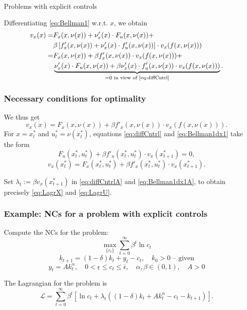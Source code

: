 \documentclass[10pt]{beamer}
\theoremstyle{definition}
\begin{document}
\begin{section}{Problems with explicit controls}
\begin{frame}[fragile]
Differentiating \eqref{eq:Bellman1} w.r.t. $ x $, we obtain
\begin{equation*}
\begin{split}
 v_x(x) = & F_x(x,\nu(x)) +  \nu'_x(x) \cdot F_u(x,\nu(x)) + \\
 & \beta \left[ f'_x(x,\nu(x)) + \nu'_x(x) \cdot f'_u(x,\nu(x))  \right]\cdot v_x(f(x,\nu(x)))\\
 = & F_x(x,\nu(x)) + \beta  f'_x(x,\nu(x))\cdot v_x(f(x,\nu(x))) + \\
 &  \underbrace{\nu'_x(x) \cdot F_u(x,\nu(x)) + \beta \nu'_x(x) \cdot f'_u(x,\nu(x)) \cdot v_x(f(x,\nu(x)))}_{=0 \text{ in view of \eqref{eq:diffCntrl}}}.
\end{split}
\end{equation*}
\end{frame}


\begin{frame}[fragile]
\frametitle{Necessary conditions for optimality}
We thus get \begin{equation}
v_x(x) = F_x(x,\nu(x)) + \beta  f'_x(x,\nu(x))\cdot v_x(f(x,\nu(x))).
\label{eq:Bellman1dx1}
\end{equation}
For $ x=x^*_t $ and $ u^*_t = \nu(x^*_t) $, equations \eqref{eq:diffCntrl} and \eqref{eq:Bellman1dx1} take the form
\begin{equation}
F_u(x^*_t,u^*_t) + \beta f'_u(x^*_t,u^*_t) \cdot v_x(x^*_{t+1}) = 0,
\label{eq:diffCntrlA} 
\end{equation}
\begin{equation}
v_x(x^*_t) = F_x(x^*_t,u^*_t) + \beta  f'_x(x^*_t,u^*_t)\cdot v_x(x^*_{t+1}).
\label{eq:Bellman1dx1A}
\end{equation}

Set $ \lambda_t := \beta v_x(x^*_{t+1}) $ in \eqref{eq:diffCntrlA} and \eqref{eq:Bellman1dx1A}, to obtain precisely \eqref{eq:LagrX} and \eqref{eq:LagrU}.
\end{frame}


\begin{frame}[fragile]
\frametitle{Example: NCs for a problem with explicit controls}
Compute the NCs for the problem:
\[ \max_{\{c_t\}} \sum_{t=0}^{\infty}\beta^t \ln c_t  \]
\[ k_{t+1} = (1-\delta)k_t + y_t - c_t,\quad k_0>0 \text{ -- given} \] \[ y_t=A k_t^\alpha , \quad 0<\underline{\epsilon} \leq c_t \leq \overline{\epsilon}, \quad \alpha,\beta \in (0,1), \quad A>0\]\bigskip \pause

The Lagrangian for the problem is \[ \mathcal{L} = \sum_{t=0}^{\infty}\beta^t \left[\ln c_t + \lambda_t ((1-\delta)k_t + Ak_t^\alpha - c_t -k_{t+1}) \right]. \]


\end{frame}
\end{section}
\end{document}
